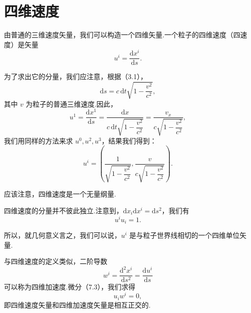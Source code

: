 \section{四维速度}

由普通的三维速度矢量，我们可以构造一个四维矢量.一个粒子的四维速度（四速度）是矢量
\begin{equation}
  u^i=\frac{\mathrm{d}x^i}{\mathrm{d}s}.
\end{equation}

为了求出它的分量，我们应注意，根据（3.1），
\begin{equation*}
  \mathrm{d}s=c\,\mathrm{d}t\sqrt{1-\frac{v^2}{c^2}},
\end{equation*}
其中 $v$ 为粒子的普通三维速度.因此，
\begin{equation*}
  u^1=\frac{\mathrm{d}x^1}{\mathrm{d}s}
  =\frac{\mathrm{d}x}{c\,\mathrm{d}t\sqrt{1-\dfrac{v^2}{c^2}}}
  =\frac{v_x}{c\sqrt{1-\dfrac{v^2}{c^2}}},
\end{equation*}
我们用同样的方法来求 $u^0,u^2,u^3$，结果我们得到：
\begin{equation}
  u^i=\left(\frac{1}{\sqrt{1-\dfrac{v^2}{c^2}}},
  \frac{v}{c\sqrt{1-\dfrac{v^2}{c^2}}}\right).
\end{equation}

应该注意，四维速度是一个无量纲量.

四维速度的分量并不彼此独立.注意到，$\mathrm{d}x_i\mathrm{d}x^i=\mathrm{d}s^2$，我们有
\begin{equation}
  u^iu_i=1.
\end{equation}

所以，就几何意义言之，我们可以说，$u^i$ 是与粒子世界线相切的一个四维单位矢量.

与四维速度的定义类似，二阶导数
\begin{equation*}
  w^i=\frac{\mathrm{d}^2x^i}{\mathrm{d}s^2}=\frac{\mathrm{d}u^i}{\mathrm{d}s}
\end{equation*}
可以称为四维加速度.微分（7.3），我们求得
\begin{equation}
  u_iw^i=0,
\end{equation}
即四维速度矢量和四维加速度矢量是相互正交的.

